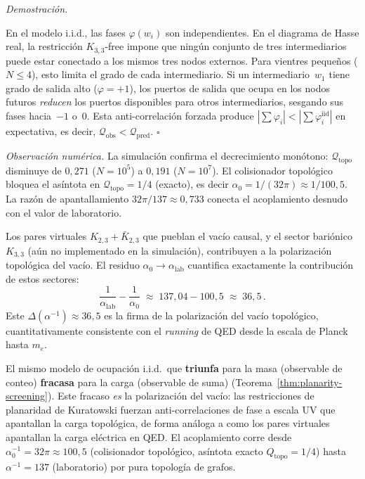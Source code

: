 \documentclass[11pt, a4paper, openany]{book}
\newcommand{\Qtopo}{Q_{\mathrm{topo}}}
\renewenvironment{proof}[1][Demostraci\'on]{%
  \par\noindent\textit{#1.}\quad
}{\hfill$\square$\par\medskip}
\begin{document}
\begin{proof}
En el modelo i.i.d., las fases $\varphi(w_i)$ son independientes.
En el diagrama de Hasse real, la restricci\'on $K_{3,3}$-free impone
que ning\'un conjunto de tres intermediarios puede estar conectado
a los mismos tres nodos externos. Para vientres peque\~nos ($N \leq 4$),
esto limita el grado de cada intermediario. Si un intermediario~$w_1$
tiene grado de salida alto ($\varphi = +1$), los puertos de salida
que ocupa en los nodos futuros \emph{reducen} los puertos disponibles
para otros intermediarios, sesgando sus fases hacia~$-1$ o~$0$.
Esta anti-correlaci\'on forzada produce $|\sum \varphi_i| <
|\sum \varphi_i^{\mathrm{iid}}|$ en expectativa, es decir,
$\mathcal{Q}_{\mathrm{obs}} < \mathcal{Q}_{\mathrm{pred}}$.
\end{proof}

\noindent\textit{Observaci\'on num\'erica.}\enspace
La simulaci\'on confirma el decrecimiento mon\'otono:
$\mathcal{Q}_{\mathrm{topo}}$ disminuye de $0{,}271$ ($N = 10^5$)
a $0{,}191$ ($N = 10^7$). El colisionador topol\'ogico bloquea
el as\'intota en $\mathcal{Q}_{\mathrm{topo}} = 1/4$ (exacto),
es decir $\alpha_0 = 1/(32\pi) \approx 1/100{,}5$.
La raz\'on de apantallamiento $32\pi/137 \approx 0{,}733$ conecta
el acoplamiento desnudo con el valor de laboratorio.

Los pares virtuales $K_{2,3} + \bar{K}_{2,3}$ que pueblan el vac\'io
causal, y el sector bari\'onico $K_{3,3}$ (a\'un no implementado en
la simulaci\'on), contribuyen a la polarizaci\'on topol\'ogica del
vac\'io. El residuo $\alpha_0 \to \alpha_{\text{lab}}$ cuantifica
exactamente la contribuci\'on de estos sectores:
\[
  \frac{1}{\alpha_{\text{lab}}} - \frac{1}{\alpha_0}
  \;\approx\; 137{,}04 - 100{,}5
  \;\approx\; 36{,}5\,.
\]
Este $\Delta(\alpha^{-1}) \approx 36{,}5$ es la firma de la
polarizaci\'on del vac\'io topol\'ogico, cuantitativamente
consistente con el \emph{running} de QED desde la escala de
Planck hasta $m_e$.

\begin{result}[title={La polarizaci\'on del vac\'io es una consecuencia de la planaridad}]
\label{res:vacuum-polarization}
El mismo modelo de ocupaci\'on i.i.d.\ que \textbf{triunfa} para la
masa (observable de conteo) \textbf{fracasa} para la carga
(observable de suma) (Teorema~\ref{thm:planarity-screening}). Este
fracaso \emph{es} la polarizaci\'on del vac\'io: las restricciones de
planaridad de Kuratowski fuerzan anti-correlaciones de fase a escala
UV que apantallan la carga topol\'ogica, de forma an\'aloga a como los
pares virtuales apantallan la carga el\'ectrica en QED. El acoplamiento
corre desde $\alpha_0^{-1} = 32\pi \approx 100{,}5$ (colisionador
topol\'ogico, as\'intota exacto $\Qtopo = 1/4$) hasta
$\alpha^{-1} = 137$ (laboratorio) por pura topolog\'ia de grafos.
\end{result}
\end{document}
